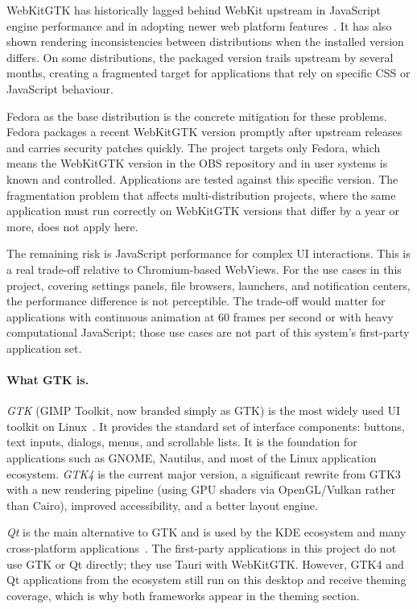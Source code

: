 WebKitGTK has historically lagged behind WebKit upstream in JavaScript engine
performance and in adopting newer web platform features~\cite{tauri:webkit}. It
has also shown rendering inconsistencies between distributions when the installed
version differs. On some distributions, the packaged version trails upstream by
several months, creating a fragmented target for applications that rely on
specific CSS or JavaScript behaviour.

Fedora as the base distribution is the concrete mitigation for these problems.
Fedora packages a recent WebKitGTK version promptly after upstream releases
and carries security patches quickly. The project targets only Fedora, which
means the WebKitGTK version in the OBS repository and in user systems is
known and controlled. Applications are tested against this specific version.
The fragmentation problem that affects multi-distribution projects, where the
same application must run correctly on WebKitGTK versions that differ by a
year or more, does not apply here.

The remaining risk is JavaScript performance for complex UI interactions. This
is a real trade-off relative to Chromium-based WebViews. For the use cases in
this project, covering settings panels, file browsers, launchers, and notification
centers, the performance difference is not perceptible. The trade-off would
matter for applications with continuous animation at 60 frames per second or
with heavy computational JavaScript; those use cases are not part of this
system's first-party application set.

\paragraph{What GTK is.}
\emph{GTK} (GIMP Toolkit, now branded simply as GTK) is the most widely used
UI toolkit on Linux~\cite{gtk}. It provides the standard set of interface
components: buttons, text inputs, dialogs, menus, and scrollable lists. It is
the foundation for applications such as GNOME, Nautilus, and most of the Linux
application ecosystem. \emph{GTK4} is the current major version, a significant
rewrite from GTK3 with a new rendering pipeline (using GPU shaders via
OpenGL/Vulkan rather than Cairo), improved accessibility, and a better layout
engine.

\emph{Qt} is the main alternative to GTK and is used by the KDE ecosystem and
many cross-platform applications~\cite{qt}. The first-party applications in
this project do not use GTK or Qt directly; they use Tauri with WebKitGTK.
However, GTK4 and Qt applications from the ecosystem still run on this desktop
and receive theming coverage, which is why both frameworks appear in the theming
section.

